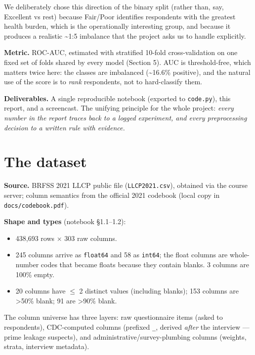 \documentclass[11pt,a4paper]{article}
\providecommand{\tightlist}{\setlength{\itemsep}{2pt}\setlength{\parskip}{0pt}}
\begin{document}
{We deliberately chose this direction of the binary split (rather than, say, Excellent vs rest) because Fair/Poor identifies respondents with the greatest health burden, which is the operationally interesting group, and because it produces a realistic \textasciitilde1:5 imbalance that the project asks us to handle explicitly.

\textbf{Metric.} ROC-AUC, estimated with stratified 10-fold cross-validation on one fixed set of folds shared by every model (Section 5). AUC is threshold-free, which matters twice here: the classes are imbalanced (\textasciitilde16.6\% positive), and the natural use of the score is to \emph{rank} respondents, not to hard-classify them.

\textbf{Deliverables.} A single reproducible notebook (exported to \texttt{code.py}), this report, and a screencast. The unifying principle for the whole project: \emph{every number in the report traces back to a logged experiment, and every preprocessing decision to a written rule with evidence.}

\section{The dataset}\label{the-dataset}

\textbf{Source.} BRFSS 2021 LLCP public file (\texttt{LLCP2021.csv}), obtained via the course server; column semantics from the official 2021 codebook (local copy in \texttt{docs/codebook.pdf}).

\textbf{Shape and types} (notebook \S{}1.1--1.2):

\begin{itemize}
\tightlist
\item
  438,693 rows $\times$ 303 raw columns.
\item
  245 columns arrive as \texttt{float64} and 58 as \texttt{int64}; the float columns are whole-number codes that became floats because they contain blanks. 3 columns are 100\% empty.
\item
  20 columns have $\le$ 2 distinct values (including blanks); 153 columns are \textgreater50\% blank; 91 are \textgreater90\% blank.
\end{itemize}

The column universe has three layers: raw questionnaire items (asked to respondents), CDC-computed columns (prefixed \texttt{\_}, derived \emph{after} the interview --- prime leakage suspects), and administrative/survey-plumbing columns (weights, strata, interview metadata).

}
\end{document}
